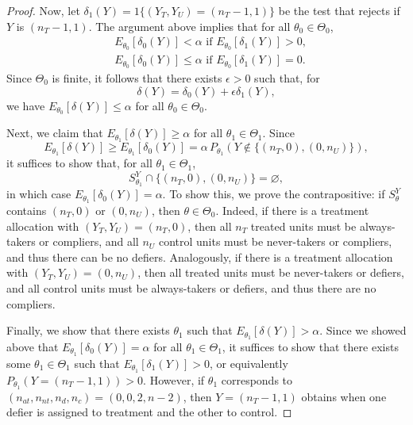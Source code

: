 \documentclass[12pt,reqno]{amsart}
\theoremstyle{theorem}
\theoremstyle{definition}
\let\emptyset\varnothing
\newcommand{\0}{\mathbf{0}}
\newcommand{\1}{\mathbf{1}}
\begin{document}
\begin{proof}
Now, let $\delta_1(Y) = 1\{ (Y_T,Y_U) = (n_T-1,1)\}$ be the test that rejects if $Y$ is $(n_T-1,1)$. The argument above implies that for all $\theta_0 \in \Theta_0$,
\begin{align*}
& E_{\theta_0 }[\delta_0(Y)]  < \alpha \text{ if } E_{\theta_0}[\delta_1(Y)] > 0, \\
& E_{\theta_0 }[\delta_0(Y)] \leq  \alpha \text{ if } E_{\theta_0}[\delta_1(Y)] = 0 .
\end{align*}
Since $\Theta_0$ is finite, it follows that there exists $\epsilon >0$ such that, for
\[
\delta(Y) = \delta_0(Y) + \epsilon \delta_1(Y),
\]
we have $E_{\theta_0}[ \delta(Y) ] \leq \alpha$ for all $\theta_0 \in \Theta_0$. 

Next, we claim that $E_{\theta_1}[\delta(Y)] \geq \alpha$ for all $\theta_1 \in \Theta_1$. Since
\[
E_{\theta_1}[\delta(Y)] \geq E_{\theta_1}[ \delta_0(Y) ] 
= \alpha \, P_{\theta_1}\!\left( Y \not\in \{(n_T,0), (0,n_U) \} \right),
\]
it suffices to show that, for all $\theta_1 \in \Theta_1$,
\[
S_{\theta_1}^Y \cap \{(n_T,0), (0,n_U) \} = \emptyset,
\]
in which case $E_{\theta_1}[\delta_0(Y)] = \alpha$. To show this, we prove the contrapositive: if $S_{\theta}^Y$ contains $(n_T,0)$ or $(0,n_U)$, then $\theta \in \Theta_0$. Indeed, if there is a treatment allocation with $(Y_T,Y_U) = (n_T,0)$, then all $n_T$ treated units must be always-takers or compliers, and all $n_U$ control units must be never-takers or compliers, and thus there can be no defiers. Analogously, if there is a treatment allocation with $(Y_T,Y_U) = (0,n_U)$, then all treated units must be never-takers or defiers, and all control units must be always-takers or defiers, and thus there are no compliers.

Finally, we show that there exists $\theta_1$ such that $E_{\theta_1}[\delta(Y)] > \alpha$. Since we showed above that $E_{\theta_1}[\delta_0(Y)] = \alpha$ for all $\theta_1 \in \Theta_1$, it suffices to show that there exists some $\theta_1 \in \Theta_1$ such that $E_{\theta_1}[\delta_1(Y)] > 0$, or equivalently $P_{\theta_1}( Y = (n_T-1,1) ) > 0$. However, if $\theta_1$ corresponds to $(n_{at},n_{nt},n_d,n_c) = (0,0,2,n-2)$, then $Y = (n_T-1,1)$ obtains when one defier is assigned to treatment and the other to control.
\end{proof}
\end{document}
